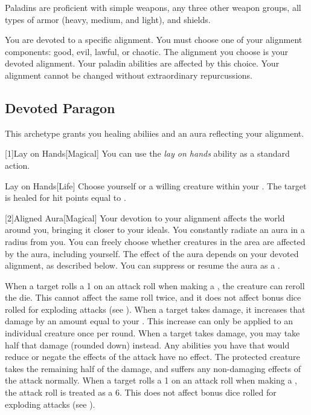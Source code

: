         Paladins are proficient with simple weapons, any three other weapon groups, all types of armor (heavy, medium, and light), and shields.

        You are devoted to a specific alignment.
        You must choose one of your alignment components: good, evil, lawful, or chaotic.
        The alignment you choose is your devoted alignment.
        Your paladin abilities are affected by this choice.
        Your alignment cannot be changed without extraordinary repurcussions.

    \subsection{Devoted Paragon}
        This archetype grants you healing abiliies and an aura reflecting your alignment.

        [1]{Lay on Hands}[Magical] You can use the \textit{lay on hands} ability as a standard action.
        \begin{freeability}{Lay on Hands}[Life]
            Choose yourself or a willing creature within your .
            The target is healed for hit points equal to .
        \end{freeability}

        [2]{Aligned Aura}[Magical]
        Your devotion to your alignment affects the world around you, bringing it closer to your ideals.
        You constantly radiate an aura in a \areamed radius  from you.
        You can freely choose whether creatures in the area are affected by the aura, including yourself.
        The effect of the aura depends on your devoted alignment, as described below.
        You can suppress or resume the aura as a .

         When a target rolls a 1 on an attack roll when making a , the creature can reroll the die.
        This cannot affect the same roll twice, and it does not affect bonus dice rolled for exploding attacks (see ).
         When a target takes damage, it increases that damage by an amount equal to your .
        This increase can only be applied to an individual creature once per round.
         When a target takes damage, you may take half that damage (rounded down) instead.
        Any abilities you have that would reduce or negate the effects of the attack have no effect.
        The protected creature takes the remaining half of the damage, and suffers any non-damaging effects of the attack normally.
         When a target rolls a 1 on an attack roll when making a , the attack roll is treated as a 6.
        This does not affect bonus dice rolled for exploding attacks (see ).

